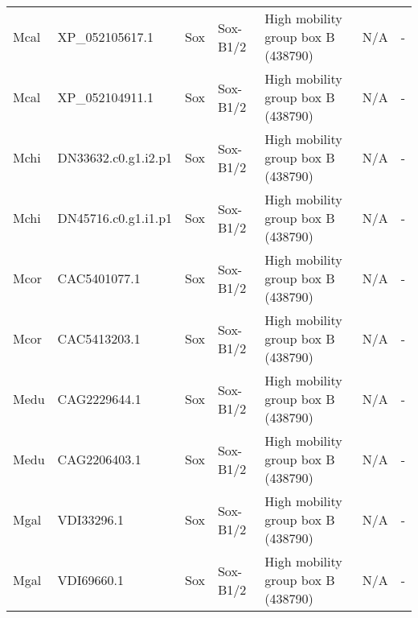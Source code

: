 \documentclass[../main.tex]{subfiles}
\begin{document}
\begin{landscape}
\begin{longtable}{lllllll}
		Mcal           & XP\_052105617.1       & Sox            & Sox-B1/2            & High mobility group box B (438790)          & N/A                                                                    & -                    \\
		Mcal           & XP\_052104911.1       & Sox            & Sox-B1/2            & High mobility group box B (438790)          & N/A                                                                    & -                    \\
		Mchi           & DN33632.c0.g1.i2.p1   & Sox            & Sox-B1/2            & High mobility group box B (438790)          & N/A                                                                    & -                    \\
		Mchi           & DN45716.c0.g1.i1.p1   & Sox            & Sox-B1/2            & High mobility group box B (438790)          & N/A                                                                    & -                    \\
		Mcor           & CAC5401077.1          & Sox            & Sox-B1/2            & High mobility group box B (438790)          & N/A                                                                    & -                    \\
		Mcor           & CAC5413203.1          & Sox            & Sox-B1/2            & High mobility group box B (438790)          & N/A                                                                    & -                    \\
		Medu           & CAG2229644.1          & Sox            & Sox-B1/2            & High mobility group box B (438790)          & N/A                                                                    & -                    \\
		Medu           & CAG2206403.1          & Sox            & Sox-B1/2            & High mobility group box B (438790)          & N/A                                                                    & -                    \\
		Mgal           & VDI33296.1            & Sox            & Sox-B1/2            & High mobility group box B (438790)          & N/A                                                                    & -                    \\
		Mgal           & VDI69660.1            & Sox            & Sox-B1/2            & High mobility group box B (438790)          & N/A                                                                    & -                    \\

\end{longtable}
\end{landscape}
\end{document}
